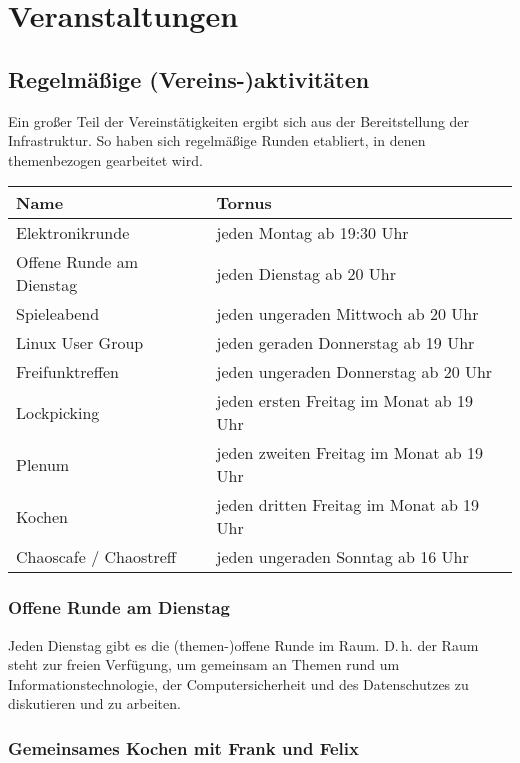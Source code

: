 \documentclass[10pt,DIV16]{scrartcl}
\begin{document}
\section{Veranstaltungen}

\subsection{Regelmäßige (Vereins-)aktivitäten}

Ein großer Teil der Vereinstätigkeiten ergibt sich aus der
Bereitstellung der Infrastruktur. So haben sich regelmäßige Runden
etabliert, in denen themenbezogen gearbeitet wird.

\begin{table}[h]
	\begin{tabular}{l|l}
		Name   &  Tornus \\ \hline
		Elektronikrunde   &  jeden Montag ab 19:30 Uhr\\
		Offene Runde am Dienstag   &  jeden Dienstag ab 20 Uhr\\
		Spieleabend   &  jeden ungeraden Mittwoch ab 20 Uhr\\
		Linux User Group   &  jeden geraden Donnerstag ab 19 Uhr\\
		Freifunktreffen   &  jeden ungeraden Donnerstag ab 20 Uhr\\
		Lockpicking   &  jeden ersten Freitag im Monat ab 19 Uhr\\
		Plenum   &  jeden zweiten Freitag im Monat ab 19 Uhr\\
		Kochen   &  jeden dritten Freitag im Monat ab 19 Uhr\\
		Chaoscafe / Chaostreff   &  jeden ungeraden Sonntag ab 16 Uhr\\
\end{tabular}
\end{table}

\subsubsection{Offene Runde am Dienstag}

Jeden Dienstag gibt es die (themen-)offene Runde im Raum. D.\,h. der Raum
steht zur freien Verfügung, um gemeinsam an Themen rund um
Informationstechnologie, der Computersicherheit und des
Datenschutzes zu diskutieren und zu arbeiten.

\subsubsection{Gemeinsames Kochen mit Frank und Felix}
\end{document}
